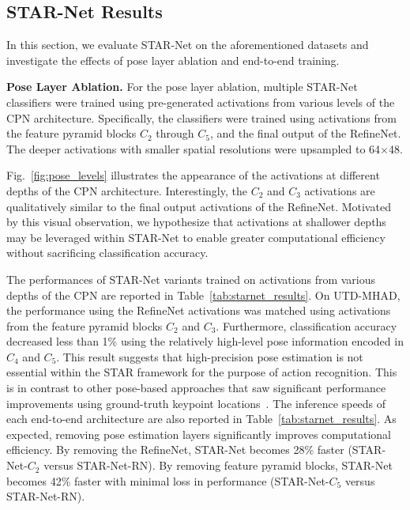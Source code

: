 \documentclass[10pt, conference, compsocconf]{IEEEtran}
\begin{document}
\subsection{STAR-Net Results}
\label{sec:starnet_results}

In this section, we evaluate STAR-Net on the aforementioned datasets and investigate the effects of pose layer ablation and end-to-end training. 

\smallskip\noindent\textbf{Pose Layer Ablation.} For the pose layer ablation, multiple STAR-Net classifiers were trained using pre-generated activations from various levels of the CPN architecture. Specifically, the classifiers were trained using activations from the feature pyramid blocks $C_2$ through $C_5$, and the final output of the RefineNet. The deeper activations with smaller spatial resolutions were upsampled to 64$\times$48. 


Fig.~\ref{fig:pose_levels} illustrates the appearance of the activations at different depths of the CPN architecture. Interestingly, the $C_2$ and $C_3$ activations are qualitatively similar to the final output activations of the RefineNet. Motivated by this visual observation, we hypothesize that activations at shallower depths may be leveraged within STAR-Net to enable greater computational efficiency without sacrificing classification accuracy. 



The performances of STAR-Net variants trained on activations from various depths of the CPN are reported in Table~\ref{tab:starnet_results}. On UTD-MHAD, the performance using the RefineNet activations was matched using activations from the feature pyramid blocks $C_2$ and $C_3$. Furthermore, classification accuracy decreased less than 1\% using the relatively high-level pose information encoded in $C_4$ and $C_5$. This result suggests that high-precision pose estimation is not essential within the STAR framework for the purpose of action recognition. This is in contrast to other pose-based approaches that saw significant performance improvements using ground-truth keypoint locations~\cite{choutas2018potion, cheronICCV15, zolfaghari2017chained}. The inference speeds of each end-to-end architecture are also reported in Table~\ref{tab:starnet_results}. As expected, removing pose estimation layers significantly improves computational efficiency. By removing the RefineNet, STAR-Net becomes 28\% faster (STAR-Net-$C_2$ versus STAR-Net-RN). By removing feature pyramid blocks, STAR-Net becomes 42\% faster with minimal loss in performance (STAR-Net-$C_5$ versus STAR-Net-RN). 
\end{document}
